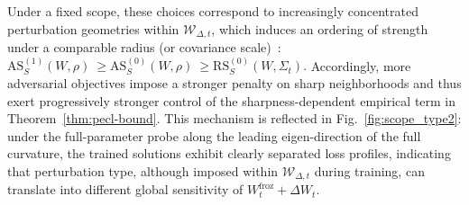 \documentclass{article}
\theoremstyle{plain}
\theoremstyle{definition}
\theoremstyle{remark}
\begin{document}


Under a fixed scope, these choices correspond to increasingly concentrated perturbation geometries within $\mathcal W_{\Delta,t}$, which induces an ordering of strength under a comparable radius (or covariance scale)~\cite{mollenhoffSAMOptimalRelaxation2022,Zhang_GAM}:
$ \mathrm{AS}^{(1)}_S(W,\rho)\ \ge \mathrm{AS}^{(0)}_S(W,\rho)\ \ge \mathrm{RS}^{(0)}_S(W,\Sigma_t).$
Accordingly, more adversarial objectives impose a stronger penalty on sharp neighborhoods and thus exert progressively stronger control of the sharpness-dependent empirical term in Theorem~\ref{thm:pecl-bound}.
This mechanism is reflected in Fig.~\ref{fig:scope_type2}: under the full-parameter probe along the leading eigen-direction of the full curvature, the trained solutions exhibit clearly separated loss profiles, indicating that perturbation type, although imposed within $\mathcal W_{\Delta,t}$ during training, can translate into different global sensitivity of $W^{\mathrm{froz}}_t+\Delta W_t$.

\end{document}
